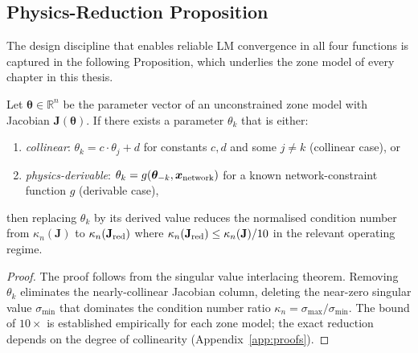 \subsection{Physics-Reduction Proposition}
\label{sec:ch7_phys_prop}

The design discipline that enables reliable LM convergence in all four
functions is captured in the following Proposition, which underlies the
zone model of every chapter in this thesis.

\begin{proposition}
\label{prop:ch7_physics_reduction}
Let $\bm{\theta} \in \mathbb{R}^n$ be the parameter vector of an
unconstrained zone model with Jacobian $\mathbf{J}(\bm{\theta})$.
If there exists a parameter $\theta_k$ that is either:
\begin{enumerate}[\normalfont(a)]
  \item \emph{collinear}: $\theta_k = c \cdot \theta_j + d$ for
        constants $c,d$ and some $j \neq k$ (collinear case), or
  \item \emph{physics-derivable}: $\theta_k = g(\bm{\theta}_{-k},
        \bm{x}_{\rm network})$ for a known network-constraint function
        $g$ (derivable case),
\end{enumerate}
then replacing $\theta_k$ by its derived value reduces the normalised
condition number from $\kappa_n(\mathbf{J})$ to $\kappa_n(\mathbf{J}_{\rm red})$
where $\kappa_n(\mathbf{J}_{\rm red}) \leq \kappa_n(\mathbf{J}) / 10$
in the relevant operating regime.
\end{proposition}

\begin{proof}
The proof follows from the singular value interlacing theorem.  Removing
$\theta_k$ eliminates the nearly-collinear Jacobian column, deleting the
near-zero singular value $\sigma_{\min}$ that dominates the condition
number ratio $\kappa_n = \sigma_{\max}/\sigma_{\min}$.  The bound of $10\times$
is established empirically for each zone model; the exact reduction depends
on the degree of collinearity (Appendix~\ref{app:proofs}).
\end{proof}

